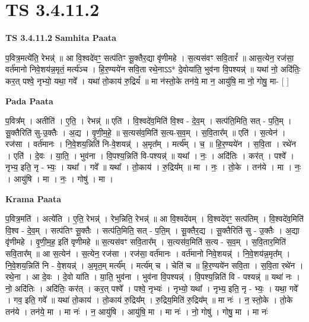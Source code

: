 \documentclass[17pt]{extarticle}
\begin{document}
\section{ TS 3.4.11.2 }

\textbf{TS 3.4.11.2 } \newline
\textbf{Samhita Paata} \newline

प॒वित्र॒मत्ये॑ति॒ रेभन्न्॑ ॥ आ वि॒श्वदे॑वꣳ॒॒ सत्प॑तिꣳ सू॒क्तैर॒द्या वृ॑णीमहे । स॒त्यस॑वꣳ सवि॒तारं᳚ ॥ आस॒त्येन॒ रज॑सा॒ वर्त॑मानो निवे॒शय॑न्न॒मृतं॒ मर्त्य॑ञ्च । हि॒र॒ण्यये॑न सवि॒ता रथे॒नाऽऽ* दे॒वोया॑ति॒ भुव॑ना वि॒पश्यन्न्॑ ॥ यथा॑ नो॒ अदि॑तिः॒ कर॒त् पश्वे॒ नृभ्यो॒ यथा॒ गवे᳚ । यथा॑ तो॒काय॑ रु॒द्रियं᳚ ॥ मा न॑स्तो॒के तन॑ये॒ मा न॒ आयु॑षि॒ मा नो॒ गोषु॒ मा- [  ] \newline

\textbf{Pada Paata} \newline

प॒वित्र᳚म् । अतीति॑ । ए॒ति॒ । रेभन्न्॑ ॥ एति॑ । वि॒श्वदे॑व॒मिति॑ वि॒श्व - दे॒व॒म् । सत्प॑ति॒मिति॒ सत् - प॒ति॒म् । सू॒क्तैरिति॑ सु-उ॒क्तैः । अ॒द्य । वृ॒णी॒म॒हे॒ ॥ स॒त्यस॑व॒मिति॑ स॒त्य-स॒व॒म् । स॒वि॒तार᳚म् ॥ एति॑ । स॒त्येन॑ । रज॑सा । वर्त॑मानः । नि॒वे॒शय॒न्निति॑ नि-वे॒शयन्न्॑ । अ॒मृत᳚म् । मर्त्य᳚म् । च॒ ॥ हि॒र॒ण्यये॑न । स॒वि॒ता । रथे॑न । एति॑ । दे॒वः । या॒ति॒ । भुव॑ना । वि॒पश्य॒न्निति॑ वि-पश्यन्न्॑ ॥ यथा᳚ । नः॒ । अदि॑तिः । कर॑त् । पश्वे᳚ । नृभ्य॒ इति॒ नृ - भ्यः॒ । यथा᳚ । गवे᳚ ॥ यथा᳚ । तो॒काय॑ । रु॒द्रिय᳚म् ॥ मा । नः॒ । तो॒के । तन॑ये । मा । नः॒ । आयु॑षि । मा । नः॒ । गोषु॑ । मा ।  \newline


\textbf{Krama Paata} \newline

प॒वित्र॒मति॑ । अत्ये॑ति । ए॒ति॒ रेभन्न्॑ । रेभ॒न्निति॒ रेभन्न्॑ ॥ आ वि॒श्वदे॑वम् । वि॒श्वदे॑वꣳ॒॒ सत्प॑तिम् । वि॒श्वदे॑व॒मिति॑ वि॒श्व - दे॒व॒म् । सत्प॑तिꣳ सू॒क्तैः । सत्प॑ति॒मिति॒ सत् - प॒ति॒म् । सू॒क्तैर॒द्य । सू॒क्तैरिति॑ सु - उ॒क्तैः । अ॒द्या वृ॑णीमहे । वृ॒णी॒म॒ह॒ इति॑ वृणीमहे ॥ स॒त्यस॑वꣳ सवि॒तार᳚म् । स॒त्यस॑व॒मिति॑ स॒त्य - स॒व॒म् । स॒वि॒तार॒मिति॑ सवि॒तार᳚म् ॥ आ स॒त्येन॑ । स॒त्येन॒ रज॑सा । रज॑सा॒ वर्त॑मानः । वर्त॑मानो निवे॒शयन्न्॑ । नि॒वे॒शय॑न्न॒मृत᳚म् । नि॒वे॒शय॒न्निति॑ नि - वे॒शयन्न्॑ । अ॒मृत॒म् मर्त्य᳚म् । मर्त्य॑म् च । चेति॑ च ॥ हि॒र॒ण्यये॑न सवि॒ता । स॒वि॒ता रथे॑न । रथे॒ना । आ दे॒वः । दे॒वो या॑ति । या॒ति॒ भुव॑ना । भुव॑ना वि॒पश्यन्न्॑ । वि॒पश्य॒न्निति॑ वि - पश्यन्न्॑ ॥ यथा॑ नः । नो॒ अदि॑तिः । अदि॑तिः॒ कर॑त् । कर॒त् पश्वे᳚ । पश्वे॒ नृभ्यः॑ । नृभ्यो॒ यथा᳚ । नृभ्य॒ इति॒ नृ - भ्यः॒ । यथा॒ गवे᳚ । गव॒ इति॒ गवे᳚ ॥ यथा॑ तो॒काय॑ । तो॒काय॑ रु॒द्रिय᳚म् । रु॒द्रिय॒मिति॑ रु॒द्रिय᳚म् ॥ मा नः॑ । न॒ स्तो॒के । तो॒के तन॑ये । तन॑ये॒ मा । मा नः॑ । न॒ आयु॑षि । आयु॑षि॒ मा । मा नः॑ । नो॒ गोषु॑ । गोषु॒ मा । मा नः॑ \newline
\end{document}

